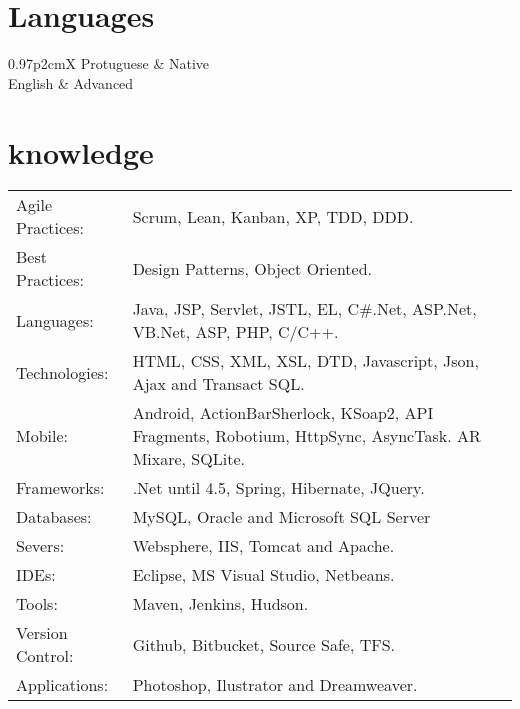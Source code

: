 \documentclass[a4paper, oneside, final]{article}
\begin{document}
\begin{center}
%

\section{Languages}

\begin{tabularx}{0.97\linewidth}{p{2cm}X}
Protuguese      & Native\\
English      & Advanced\\
\end{tabularx}

\section{knowledge}

\begin{tabularx}{0.97\linewidth}{p{3.0cm}X}
Agile Practices: & Scrum, Lean, Kanban, XP, TDD, DDD.\\
Best Practices:  & Design Patterns, Object Oriented.\\
Languages:       & Java, JSP, Servlet, JSTL, EL, C\#.Net, ASP.Net, VB.Net, ASP, PHP, C/C++.\\
Technologies:    & HTML, CSS, XML, XSL, DTD, Javascript, Json, Ajax and Transact SQL.\\
Mobile:          & Android, ActionBarSherlock, KSoap2, API Fragments, Robotium, HttpSync, AsyncTask. AR Mixare, SQLite.\\
Frameworks:      & .Net until 4.5, Spring, Hibernate, JQuery.\\
Databases:       & MySQL, Oracle and Microsoft SQL Server \\
Severs:          & Websphere, IIS, Tomcat and Apache.\\
IDEs:            & Eclipse, MS Visual Studio, Netbeans.\\
Tools:			 & Maven, Jenkins, Hudson.\\
Version Control: & Github, Bitbucket, Source Safe, TFS.\\
Applications:    & Photoshop, Ilustrator and Dreamweaver.\\
\end{tabularx}


\end{center}
\end{document}

